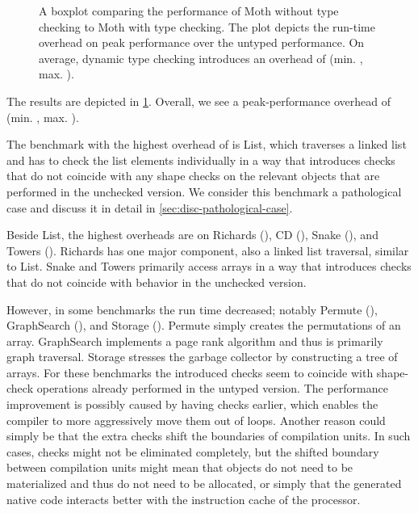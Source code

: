 \begin{figure}
	\TypingOverhead{}
	\caption{A boxplot comparing the performance of Moth without type checking
  to Moth with type checking.
  The plot depicts the run-time overhead on peak performance over
  the untyped performance. On average, dynamic type checking introduces
  an overhead of \OverheadTypingGMeanP (min. \OverheadTypingMinP, max. \OverheadTypingMaxP).}
	\label{fig:typing-overhead}
\end{figure}

The results are depicted in \cref{fig:typing-overhead}.
Overall, we see a peak-performance overhead of 
\OverheadTypingGMeanP (min. \OverheadTypingMinP, max. \OverheadTypingMaxP).


The benchmark with the highest overhead of \OverheadListP is List,
which traverses a linked list and has to check the list elements individually
in a way that introduces checks that do not coincide with any shape checks
on the relevant objects that are performed in the unchecked version.
We consider this benchmark a pathological case and discuss it
in detail in \cref{sec:disc-pathological-case}.

Beside List, the highest overheads are on
Richards (\OverheadRichardsP), CD (\OverheadCDP), 
Snake (\OverheadSnakeP), and Towers (\OverheadTowersP).
Richards has one major component, also a linked list traversal,
similar to List.
Snake and Towers primarily access  arrays in a way that introduces checks
that do not coincide with behavior in the unchecked version.


However, in some benchmarks the run time decreased; notably Permute (\OverheadPermuteP),
GraphSearch (\OverheadGraphSearchP), and Storage (\OverheadStorageP).
Permute simply creates the permutations of an array.
GraphSearch implements a page rank algorithm
and thus is primarily graph traversal.
Storage stresses the garbage collector by constructing a tree of arrays.
For these benchmarks the introduced checks seem to coincide with shape-check operations
already performed in the untyped version.
The performance improvement is possibly caused by having checks earlier,
which enables the compiler to more aggressively move them out of loops.
Another reason could simply be that the extra checks shift the boundaries
of compilation units.
In such cases, checks might not be eliminated completely,
but the shifted boundary between compilation units might mean that
objects do not need to be materialized and thus do not need to be allocated,
or simply that the generated native code interacts better with
the instruction cache of the processor.

